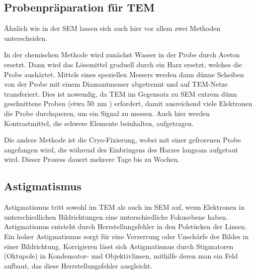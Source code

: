 \subsection{Probenpräparation für TEM}

Ähnlich wie in der SEM lassen sich auch hier vor allem zwei Methoden unterscheiden.

In der chemischen Methode wird zunächst Wasser in der Probe durch Aceton ersetzt.
Dann wird das Lösemittel graduell durch ein Harz ersetzt, welches die Probe aushärtet. \cite{bitesize}
Mittels eines speziellen Messers werden dann dünne Scheiben von der Probe mit einem Diamantmesser abgetrennt und auf TEM-Netze transferiert.
Dies ist nowendig, da TEM im Gegensatz zu SEM extrem dünn geschnittene Proben (etwa \SI{50}{nm} \cite{skript}) erfordert, damit ausreichend viele Elektronen die Probe durchqueren, um ein Signal zu messen.
Auch hier werden Kontrastmittel, die schwere Elemente beinhalten, aufgetragen.

Die andere Methode ist die Cryo-Fixierung, wobei mit einer gefrorenen Probe angefangen wird, die während des Einbringens des Harzes langsam aufgetaut wird.
Dieser Prozess dauert mehrere Tage bis zu Wochen.



\subsection{Astigmatismus}

Astigmatismus tritt sowohl im TEM als auch im SEM auf, wenn Elektronen in unterschiedlichen Bildrichtungen eine unterschiedliche Fokusebene haben.
Astigmatismus entsteht durch Herrstellungsfehler in den Polstücken der Linsen.
Ein hoher Astigmatismus sorgt für eine Verzerrung oder Unschärfe des Bildes in einer Bildrichtung. \cite{MyScope}
Korrigieren lässt sich Astigmatismus durch Stigmatoren (Oktupole) in Kondensator- und Objektivlinsen, mithilfe deren man ein Feld aufbaut, das diese Herrstellungsfehler ausgleicht.




